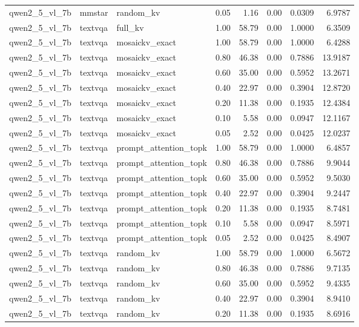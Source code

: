 \begin{longtable}{lllrrrrr}
qwen2\_5\_vl\_7b & mmstar & random\_kv & 0.05 & 1.16 & 0.00 & 0.0309 & 6.9787 \\
qwen2\_5\_vl\_7b & textvqa & full\_kv & 1.00 & 58.79 & 0.00 & 1.0000 & 6.3509 \\
qwen2\_5\_vl\_7b & textvqa & mosaickv\_exact & 1.00 & 58.79 & 0.00 & 1.0000 & 6.4288 \\
qwen2\_5\_vl\_7b & textvqa & mosaickv\_exact & 0.80 & 46.38 & 0.00 & 0.7886 & 13.9187 \\
qwen2\_5\_vl\_7b & textvqa & mosaickv\_exact & 0.60 & 35.00 & 0.00 & 0.5952 & 13.2671 \\
qwen2\_5\_vl\_7b & textvqa & mosaickv\_exact & 0.40 & 22.97 & 0.00 & 0.3904 & 12.8720 \\
qwen2\_5\_vl\_7b & textvqa & mosaickv\_exact & 0.20 & 11.38 & 0.00 & 0.1935 & 12.4384 \\
qwen2\_5\_vl\_7b & textvqa & mosaickv\_exact & 0.10 & 5.58 & 0.00 & 0.0947 & 12.1167 \\
qwen2\_5\_vl\_7b & textvqa & mosaickv\_exact & 0.05 & 2.52 & 0.00 & 0.0425 & 12.0237 \\
qwen2\_5\_vl\_7b & textvqa & prompt\_attention\_topk & 1.00 & 58.79 & 0.00 & 1.0000 & 6.4857 \\
qwen2\_5\_vl\_7b & textvqa & prompt\_attention\_topk & 0.80 & 46.38 & 0.00 & 0.7886 & 9.9044 \\
qwen2\_5\_vl\_7b & textvqa & prompt\_attention\_topk & 0.60 & 35.00 & 0.00 & 0.5952 & 9.5030 \\
qwen2\_5\_vl\_7b & textvqa & prompt\_attention\_topk & 0.40 & 22.97 & 0.00 & 0.3904 & 9.2447 \\
qwen2\_5\_vl\_7b & textvqa & prompt\_attention\_topk & 0.20 & 11.38 & 0.00 & 0.1935 & 8.7481 \\
qwen2\_5\_vl\_7b & textvqa & prompt\_attention\_topk & 0.10 & 5.58 & 0.00 & 0.0947 & 8.5971 \\
qwen2\_5\_vl\_7b & textvqa & prompt\_attention\_topk & 0.05 & 2.52 & 0.00 & 0.0425 & 8.4907 \\
qwen2\_5\_vl\_7b & textvqa & random\_kv & 1.00 & 58.79 & 0.00 & 1.0000 & 6.5672 \\
qwen2\_5\_vl\_7b & textvqa & random\_kv & 0.80 & 46.38 & 0.00 & 0.7886 & 9.7135 \\
qwen2\_5\_vl\_7b & textvqa & random\_kv & 0.60 & 35.00 & 0.00 & 0.5952 & 9.4335 \\
qwen2\_5\_vl\_7b & textvqa & random\_kv & 0.40 & 22.97 & 0.00 & 0.3904 & 8.9410 \\
qwen2\_5\_vl\_7b & textvqa & random\_kv & 0.20 & 11.38 & 0.00 & 0.1935 & 8.6916 \\

\end{longtable}
